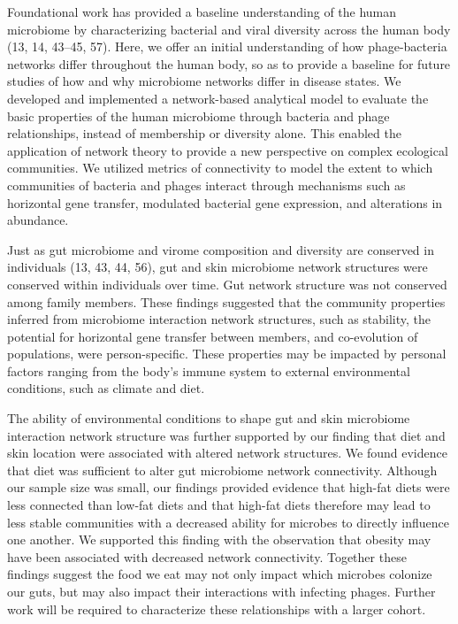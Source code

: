 \documentclass[12pt,]{article}
\begin{document}
Foundational work has provided a baseline understanding of the human
microbiome by characterizing bacterial and viral diversity across the
human body (13, 14, 43--45, 57). Here, we offer an initial understanding
of how phage-bacteria networks differ throughout the human body, so as
to provide a baseline for future studies of how and why microbiome
networks differ in disease states. We developed and implemented a
network-based analytical model to evaluate the basic properties of the
human microbiome through bacteria and phage relationships, instead of
membership or diversity alone. This enabled the application of network
theory to provide a new perspective on complex ecological communities.
We utilized metrics of connectivity to model the extent to which
communities of bacteria and phages interact through mechanisms such as
horizontal gene transfer, modulated bacterial gene expression, and
alterations in abundance.

Just as gut microbiome and virome composition and diversity are
conserved in individuals (13, 43, 44, 56), gut and skin microbiome
network structures were conserved within individuals over time. Gut
network structure was not conserved among family members. These findings
suggested that the community properties inferred from microbiome
interaction network structures, such as stability, the potential for
horizontal gene transfer between members, and co-evolution of
populations, were person-specific. These properties may be impacted by
personal factors ranging from the body's immune system to external
environmental conditions, such as climate and diet.

The ability of environmental conditions to shape gut and skin microbiome
interaction network structure was further supported by our finding that
diet and skin location were associated with altered network structures.
We found evidence that diet was sufficient to alter gut microbiome
network connectivity. Although our sample size was small, our findings
provided evidence that high-fat diets were less connected than low-fat
diets and that high-fat diets therefore may lead to less stable
communities with a decreased ability for microbes to directly influence
one another. We supported this finding with the observation that obesity
may have been associated with decreased network connectivity. Together
these findings suggest the food we eat may not only impact which
microbes colonize our guts, but may also impact their interactions with
infecting phages. Further work will be required to characterize these
relationships with a larger cohort.
\end{document}
